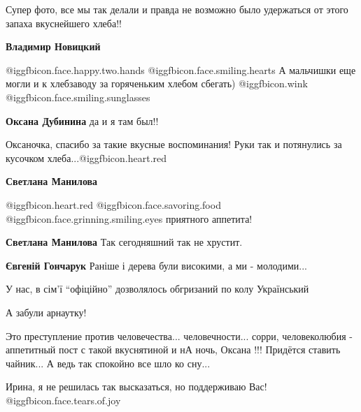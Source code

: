  
 
 
 
 
\zzSecCmt

\begin{itemize} %

Супер фото, все мы так делали и правда не возможно было удержаться от этого
запаха вкуснейшего хлеба!!

\textbf{Владимир Новицкий}  

@igg{fbicon.face.happy.two.hands}  @igg{fbicon.face.smiling.hearts}  А
мальчишки еще могли и к хлебзаводу за горяченьким хлебом
сбегать) @igg{fbicon.wink}
@igg{fbicon.face.smiling.sunglasses} 

\textbf{Оксана Дубинина} да и я там был!!

Оксаночка, спасибо за такие вкусные воспоминания! Руки так и потянулись за
кусочком хлеба...@igg{fbicon.heart.red}

\begin{itemize} %
\textbf{Светлана Манилова} 

@igg{fbicon.heart.red} @igg{fbicon.face.savoring.food}
@igg{fbicon.face.grinning.smiling.eyes}  приятного аппетита!

\textbf{Светлана Манилова} Так сегодняшний так не хрустит.

\textbf{Євгеній Гончарук} Раніше і дерева були високими, а ми - молодими...

У нас, в сім'ї \enquote{офіційно} дозволялось обгризаний по колу Український

А забули арнаутку!

\end{itemize} %


Это преступление против человечества... человечности... сорри, человеколюбия -
аппетитный пост с такой вкуснятиной и нА ночь, Оксана !!! Придётся ставить
чайник... А ведь так спокойно все шло ко сну...

\begin{itemize} %
Ирина, я не решилась так высказаться, но поддерживаю Вас! @igg{fbicon.face.tears.of.joy} 


\end{itemize}
\end{itemize}
